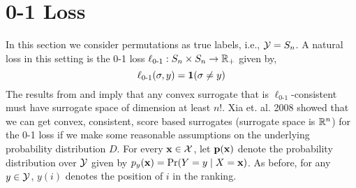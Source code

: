 \section{0-1 Loss}\label{sec:loss0-1}
In this section we consider permutations as true labels, i.e., ${\mathcal Y} = S_n$. A natural loss in this setting is the 0-1 loss $\ell_{\text{0-1}}:S_n \times S_n \to {\mathbb R}_+$ given by,
$$\ell_{\text{0-1}}(\sigma,y) = {\mathbf 1}(\sigma \neq y)$$
The results from \cite{ramaswamy2016convex} and \cite{tewari2007consistency} imply that any convex surrogate that is $\ell_{\text{0-1}}$-consistent must have surrogate space of dimension at least $n!$. Xia et. al. 2008 \cite{xia2008listwise} showed that we can get convex, consistent, score based surrogates (surrogate space is ${\mathbb R}^n$) for the 0-1 loss if we make some reasonable assumptions on the underlying probability distribution $D$. For every ${\mathbf x} \in {\mathcal X}$, let ${\mathbf p}({\mathbf x})$ denote the probability distribution over ${\mathcal Y}$ given by $p_y({\mathbf x}) = \Pr(Y = y \mid X = {\mathbf x})$. As before, for any $y \in {\mathcal Y}$, $y(i)$ denotes the position of $i$ in the ranking.

